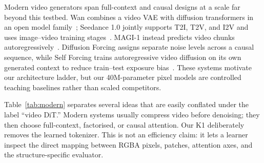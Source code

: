 \documentclass[10pt,twocolumn]{article}
\begin{document}
Modern video generators span full-context and causal designs at a scale far beyond this testbed. Wan combines a video
VAE with diffusion transformers in an open model family~\cite{wan2025}; Seedance 1.0 jointly supports T2I, T2V, and
I2V and uses image--video training stages~\cite{gao2025seedance}. MAGI-1 instead predicts video chunks
autoregressively~\cite{magi2025}. Diffusion Forcing assigns separate noise levels across a causal sequence, while Self
Forcing trains autoregressive video diffusion on its own generated context to reduce train--test exposure
bias~\cite{chen2024diffusionforcing,huang2025selfforcing}. These systems motivate our architecture ladder, but our
40M-parameter pixel models are controlled teaching baselines rather than scaled competitors.

Table~\ref{tab:modern} separates several ideas that are easily conflated under the label ``video DiT.'' Modern
systems usually compress video before denoising; they then choose full-context, factorised, or causal attention. Our
K1 deliberately removes the learned tokenizer. This is not an efficiency claim: it lets a learner inspect the direct
mapping between RGBA pixels, patches, attention axes, and the structure-specific evaluator.
\end{document}
